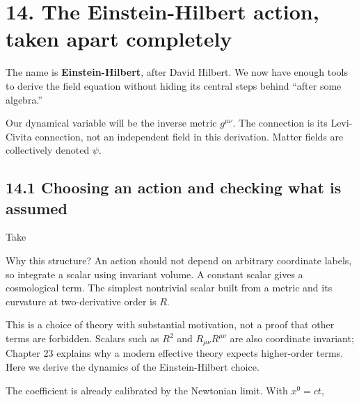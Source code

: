 \documentclass[
  11pt,
  letterpaper,
  oneside,
  openany]{scrbook}
\begin{document}
\hypertarget{chapter-14}{%
\chapter{14. The Einstein-Hilbert action, taken apart
completely}\label{chapter-14}}

The name is \textbf{Einstein-Hilbert}, after David Hilbert. We now have
enough tools to derive the field equation without hiding its central
steps behind ``after some algebra.''

Our dynamical variable will be the inverse metric \(g^{\mu\nu}\). The
connection is its Levi-Civita connection, not an independent field in
this derivation. Matter fields are collectively denoted \(\psi\).

\hypertarget{choosing-an-action-and-checking-what-is-assumed}{%
\section{14.1 Choosing an action and checking what is
assumed}\label{choosing-an-action-and-checking-what-is-assumed}}

Take

\begin{center}
\begingroup
{}
\ifdim\wd\grmathbox>\linewidth
\resizebox{\linewidth}{!}{\usebox{\grmathbox}}
\else\usebox{\grmathbox}\fi
\endgroup
\end{center}

Why this structure? An action should not depend on arbitrary coordinate
labels, so integrate a scalar using invariant volume. A constant scalar
gives a cosmological term. The simplest nontrivial scalar built from a
metric and its curvature at two-derivative order is \(R\).

This is a choice of theory with substantial motivation, not a proof that
other terms are forbidden. Scalars such as \(R^2\) and
\(R_{\mu\nu}R^{\mu\nu}\) are also coordinate invariant; Chapter 23
explains why a modern effective theory expects higher-order terms. Here
we derive the dynamics of the Einstein-Hilbert choice.

The coefficient is already calibrated by the Newtonian limit. With
\(x^0=ct\),

\begin{center}
\begingroup
{}
\ifdim\wd\grmathbox>\linewidth
\resizebox{\linewidth}{!}{\usebox{\grmathbox}}
\else\usebox{\grmathbox}\fi
\endgroup
\end{center}
\end{document}
